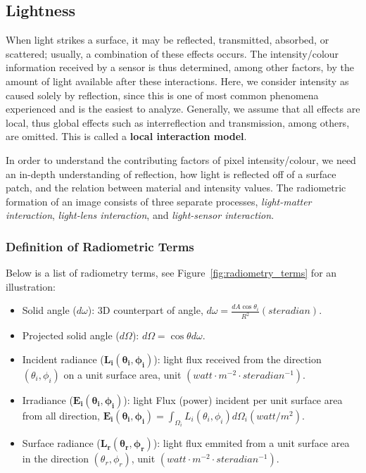 \subsection{Lightness}
When light strikes a surface, it may be reflected, transmitted, absorbed, or scattered; usually, a combination of these effects occurs. The intensity/colour information received by a sensor is thus determined, among other factors, by the amount of light available after these interactions. Here, we consider intensity as caused solely by reflection, since this is one of most common phenomena experienced and is the easiest to analyze. Generally, we assume that all effects are local, thus global effects such as interreflection and transmission, among others, are omitted. This is called a \textbf{local interaction model}. 

In order to understand the contributing factors of pixel intensity/colour, we need an in-depth understanding of reflection, \ie how light is reflected off of a surface patch, and the relation between material and intensity values. The radiometric formation of an image consists of three separate processes, \textit{light-matter interaction}, \textit{light-lens interaction}, and \textit{light-sensor interaction}.

\subsubsection{Definition of Radiometric Terms}
Below is a list of radiometry terms, see Figure~\ref{fig:radiometry_terms} for an illustration:
\begin{itemize}
\item Solid angle ($d\omega$): 3D counterpart of angle, $d\omega=\frac{dA \cos\theta_i}{R^2}\mathit{ (steradian)}$.
\item Projected solid angle ($d\Omega$): $d\Omega = \cos\theta d\omega$.
\item Incident radiance ($\mathbf{L_i(\theta_i, \phi_i)}$): light flux received from the direction $(\theta_i, \phi_i)$ on a unit surface area, unit $\mathit{ (watt\cdot m^{-2}\cdot steradian^{-1})}$.
\item Irradiance ($\mathbf{E_i(\theta_i, \phi_i)}$): light Flux (power) incident per unit surface area from all direction, $\mathbf{E_i(\theta_i, \phi_i)}=\int_{\Omega_i} L_i(\theta_i, \phi_i) d\Omega_i \mathit{ (watt/m^2)}$.
\item Surface radiance ($\mathbf{L_r(\theta_r, \phi_r)}$): light flux emmited from a unit surface area in the direction $(\theta_r, \phi_r)$, unit $\mathit{ (watt\cdot m^{-2}\cdot steradian^{-1})}$.
\end{itemize}

